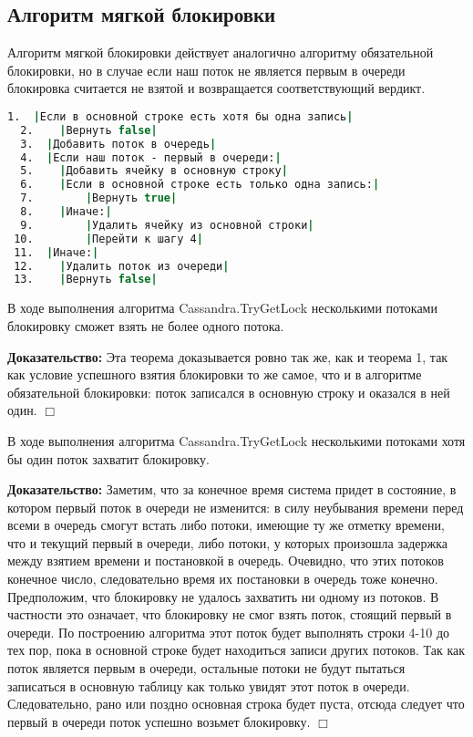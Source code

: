 \subsection{Алгоритм мягкой блокировки}

Алгоритм мягкой блокировки действует аналогично алгоритму обязательной блокировки, но в случае если наш поток не является первым в очереди блокировка считается не взятой и возвращается соответствующий вердикт.

\begin{lstlisting}[language=csh,caption={Алгоритм Cassandra.TryGetLock(lockId, threadId)}]
  1.  |Если в основной строке есть хотя бы одна запись|
  2.  	|Вернуть false|
  3.  |Добавить поток в очередь|
  4.  |Если наш поток - первый в очереди:|
  5.  	|Добавить ячейку в основную строку|
  6.  	|Если в основной строке есть только одна запись:|
  7.  		|Вернуть true|
  8.  	|Иначе:|
  9.  		|Удалить ячейку из основной строки|
 10.  		|Перейти к шагу 4|
 11.  |Иначе:|
 12.  	|Удалить поток из очереди|
 13.  	|Вернуть false|
\end{lstlisting}

\begin{theorem}
В ходе выполнения алгоритма Cassandra.TryGetLock несколькими потоками блокировку сможет взять не более одного потока.
\end{theorem}
\textbf{Доказательство:}
Эта теорема доказывается ровно так же, как и теорема 1, так как условие успешного взятия блокировки то же самое, что и в алгоритме обязательной блокировки: поток записался в основную строку и оказался в ней один.
$\Box$

\begin{theorem}
В ходе выполнения алгоритма Cassandra.TryGetLock несколькими потоками хотя бы один поток захватит блокировку.
\end{theorem}
\textbf{Доказательство:}
Заметим, что за конечное время система придет в состояние, в котором первый поток в очереди не изменится: в силу неубывания времени перед всеми в очередь смогут встать либо потоки, имеющие ту же отметку времени, что и текущий первый в очереди, либо потоки, у которых произошла задержка между взятием времени и постановкой в очередь. Очевидно, что этих потоков конечное число, следовательно время их постановки в очередь тоже конечно.
Предположим, что блокировку не удалось захватить ни одному из потоков. В частности это означает, что блокировку не смог взять поток, стоящий первый в очереди. По построению алгоритма этот поток будет выполнять строки 4-10 до тех пор, пока в основной строке будет находиться записи других потоков. Так как поток является первым в очереди, остальные потоки не будут пытаться записаться в основную таблицу как только увидят этот поток в очереди. Следовательно, рано или поздно основная строка будет пуста, отсюда следует что первый в очереди поток успешно возьмет блокировку.
$\Box$
